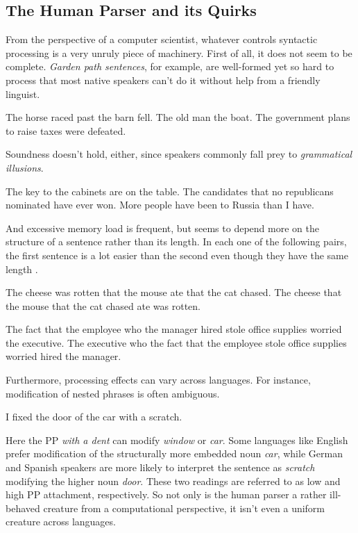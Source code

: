 \subsection{The Human Parser and its Quirks}
\label{sub:BigPicture_HumanParser}
From the perspective of a computer scientist, whatever controls syntactic processing is a very unruly piece of machinery.
First of all, it does not seem to be complete. 
\emph{Garden path sentences}, for example, are well-formed yet so hard to process that most native speakers can't do it without help from a friendly linguist.
%
\begin{exe}
    \ex
    \begin{xlist}
        \ex The horse raced past the barn fell.
        \ex The old man the boat.
        \ex The government plans to raise taxes were defeated.
    \end{xlist}
\end{exe}
%
Soundness doesn't hold, either, since speakers commonly fall prey to \emph{grammatical illusions}.
%
\begin{exe}
    \ex
    \begin{xlist}
        \ex The key to the cabinets are on the table.
        \ex The candidates that no republicans nominated have ever won.
        \ex More people have been to Russia than I have.
    \end{xlist}
\end{exe}
%
And excessive memory load is frequent, but seems to depend more on the structure of a sentence rather than its length.
In each one of the following pairs, the first sentence is a lot easier than the second even though they have the same length \citep[cf.][]{Gibson98, Resnik92}.
%
\begin{exe}
    \ex
    \begin{xlist}
        \ex The cheese was rotten that the mouse ate that the cat chased. 
        \ex The cheese that the mouse that the cat chased ate was rotten.
    \end{xlist}
    \ex
    \begin{xlist}
        \ex The fact that the employee who the manager hired stole office supplies worried the executive.
        \ex The executive who the fact that the employee stole office supplies worried hired the manager.
    \end{xlist}
\end{exe}

Furthermore, processing effects can vary across languages.
For instance, modification of nested phrases is often ambiguous.
%
\begin{exe}
    \ex I fixed the door of the car with a scratch.
\end{exe}
%
Here the PP \emph{with a dent} can modify \emph{window} or \emph{car}.
Some languages like English prefer modification of the structurally more embedded noun \emph{car}, while German and Spanish speakers are more likely to interpret the sentence as \emph{scratch} modifying the higher noun \emph{door}.
These two readings are referred to as low and high PP attachment, respectively.
So not only is the human parser a rather ill-behaved creature from a computational perspective, it isn't even a uniform creature across languages.

